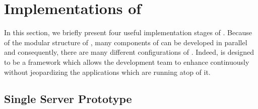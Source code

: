 \documentclass[a4paper, 10pt]{book}
\begin{document}
                                \section{Implementations of \SYNEIGHT}
                                \label{sec:implementations-syneight}

                                In this section, we briefly present four useful implementation stages
                                of \SYNEIGHT. 
                                Because of the modular structure of \SYNEIGHT, many components of \SYNEIGHT
                                can be developed in parallel and consequently, there are many
                                different configurations of \SYNEIGHT. Indeed, \SYNEIGHT is designed to be
                                a framework which allows the development team to enhance \SYNEIGHT
                                continuously without jeopardizing the applications which are running
                                atop of it. 

                                \subsection{Single Server Prototype}
                                \label{sec:single-serv-prot}
\end{document}
